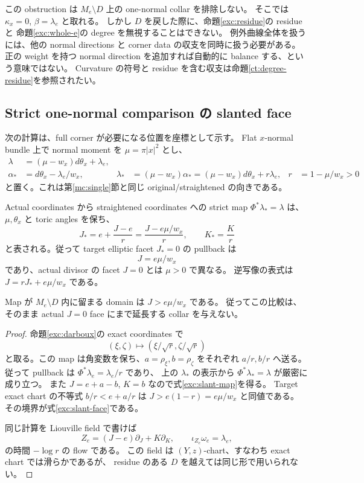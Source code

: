 この obstruction は $M_e\setminus D$ 上の one-normal collar を排除しない。
そこでは $\kappa_x=0$, $\beta=\lambda_e$ と取れる。
しかし $D$ を戻した際に、命題\ref{exc:residue}の residue と
命題\ref{exc:whole-e}の degree を無視することはできない。
例外曲線全体を扱うには、他の normal directions と corner data の収支を同時に扱う必要がある。
正の weight を持つ normal direction を追加すれば自動的に balance する、という意味ではない。
Curvature の符号と residue を含む収支は命題\ref{ct:degree-residue}を参照されたい。

\subsection{Strict one-normal comparison の slanted face}

次の計算は、full corner が必要になる位置を座標として示す。
Flat $x$-normal bundle 上で normal moment を $\mu=\pi|x|^2$ とし、
\begin{align*}
 \lambda&=(\mu-w_x)d\theta_x+\lambda_e,\\
 \alpha_*&=d\theta_x-\lambda_e/w_x,
 &\lambda_*&=(\mu-w_x)\alpha_*
            =(\mu-w_x)d\theta_x+r\lambda_e,
 &r&=1-\mu/w_x>0
\end{align*}
と置く。これは第\ref{mc:single}節と同じ original/straightened の向きである。

\begin{proposition}
\label{exc:slant}
Actual coordinates から straightened coordinates への strict map
$\Phi^*\lambda_*=\lambda$ は、$\mu,\theta_x$ と toric angles を保ち、
\begin{equation}\label{exc:slant-map}
 J_*=e+\frac{J-e}{r}
       =\frac{J-e\mu/w_x}{r},\qquad
 K_*=\frac K r
\end{equation}
と表される。従って target elliptic facet $J_*=0$ の pullback は
\begin{equation}\label{exc:slant-face}
 J=e\mu/w_x
\end{equation}
であり、actual divisor の facet $J=0$ とは $\mu>0$ で異なる。
逆写像の表式は $J=rJ_*+e\mu/w_x$ である。

Map が $M_e\setminus D$ 内に留まる domain は $J>e\mu/w_x$ である。
従ってこの比較は、そのまま actual $J=0$ face にまで延長する collar を与えない。
\end{proposition}

\begin{proof}
命題\ref{exc:darboux}の exact coordinates で
\[
 (\xi,\zeta)\longmapsto(\xi/\sqrt r,\zeta/\sqrt r)
\]
と取る。この map は角変数を保ち、$a=\rho_\xi,b=\rho_\zeta$ をそれぞれ $a/r,b/r$ へ送る。
従って pullback は $\Phi^*\lambda_e=\lambda_e/r$ であり、
上の $\lambda_*$ の表示から $\Phi^*\lambda_*=\lambda$ が厳密に成り立つ。
また $J=e+a-b$, $K=b$ なので式\eqref{exc:slant-map}を得る。
Target exact chart の不等式 $b/r<e+a/r$ は $J>e(1-r)=e\mu/w_x$ と同値である。
その境界が式\eqref{exc:slant-face}である。

同じ計算を Liouville field で書けば
\[
 Z_e=(J-e)\partial_J+K\partial_K,
 \qquad \iota_{Z_e}\omega_e=\lambda_e,
\]
の時間 $-\log r$ の flow である。
この field は $(Y,z)$-chart、すなわち exact chart では滑らかであるが、
residue のある $D$ を越えては同じ形で用いられない。
\end{proof}

